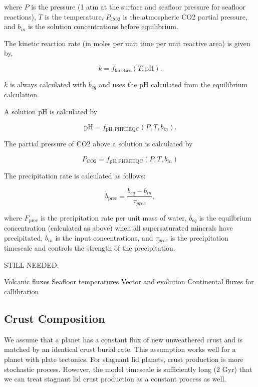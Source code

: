 \documentclass[fleqn,usenatbib]{mnras}
\begin{document}
where $P$ is the pressure (1 atm at the surface and seafloor pressure for seafloor reactions), $T$ is the temperature, $P_{\mathrm{CO2}}$ is the atmospheric CO2 partial pressure, and $b_{in}$ is the solution concentrations before equilibrium.

The kinetic reaction rate (in moles per unit time per unit reactive area) is given by,

\begin{equation}
    k = f_{\mathrm{kinetics}}(T, \mathrm{pH}).
\end{equation}

$k$ is always calculated with $b_{eq}$ and uses the pH calculated from the equilibrium calculation.

A solution pH is calculated by

\begin{equation}
    \mathrm{pH} = f_{\mathrm{pH,PHREEQC}}(P, T, b_{in}).
\end{equation}

The partial pressure of CO2 above a solution is calculated by

\begin{equation}
    P_\mathrm{CO2} = f_{\mathrm{pH,PHREEQC}}(P, T, b_{in})
\end{equation}

The precipitation rate is calculated as follows:

\begin{equation}
    \dot b_{\mathrm{prec}} = \frac{b_{eq} - b_{in}}{\tau_{prec}},
\end{equation}

where $F_{\mathrm{prec}}$ is the precipitation rate per unit mass of water, $b_{eq}$ is the equilbrium concentration (calculated as above) when all supersaturated minerals have precipitated, $b_{in}$ is the input concentrations, and $\tau_{prec}$ is the precipitation timescale and controls the strength of the precipitation.

STILL NEEDED:

Volcanic fluxes
Seafloor temperatures
Vector and evolution
Continental fluxes for callibration

\subsection{Crust Composition}

We assume that a planet has a constant flux of new unweathered crust and is matched by an identical crust burial rate. This assumption works well for a planet with plate tectonics. For stagnant lid planets, crust production is more stochastic process. However, the model timescale is sufficiently long (2 Gyr) that we can treat stagnant lid crust production as a constant process as well. 
\end{document}
